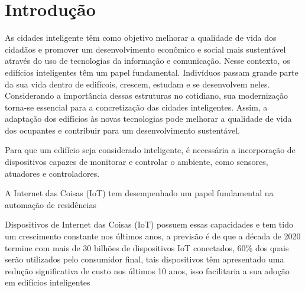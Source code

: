 \chapter{Introdução} 

As cidades inteligente têm como objetivo melhorar a qualidade de vida dos cidadãos e promover um desenvolvimento econômico e social mais
sustentável através do uso de tecnologias da informação e comunicação\cite{cetic}. Nesse contexto, os edifícios inteligentes têm um papel
fundamental. Indivíduos passam grande parte da sua vida dentro de edifícois, crescem, estudam e se desenvolvem neles\cite{art1}\cite{noauthor_how_nodate}.
Considerando a importância dessas estruturas no cotidiano, sua modernização torna-se essencial para a concretização das cidades inteligentes.
Assim, a adaptação dos edifícios às novas tecnologias pode melhorar a qualidade de vida dos ocupantes e contribuir para um desenvolvimento
sustentável.

Para que um edifício seja considerado inteligente, é necessária a incorporação de dispositivos capazes de monitorar e controlar o ambiente,
como sensores, atuadores e controladores\cite{Morvaj2011}.

A Internet das Coisas (IoT) tem desempenhado um papel fundamental na automação de residências 


Dispositivos de Internet das Coisas (IoT) possuem essas capacidades e tem tido um crescimento constante nos últimos anos, 
a previsão é de que a década de 2020 termine com mais de 30 bilhões de dispositivos IoT conectados, 
60\% dos quais serão utilizados pelo consumidor final\cite{statista-iot-connected-devices}, tais dispositivos têm apresentado 
uma redução significativa de custo nos últimos 10 anos\cite{article1}, isso facilitaria a sua adoção em edifícios inteligentes







